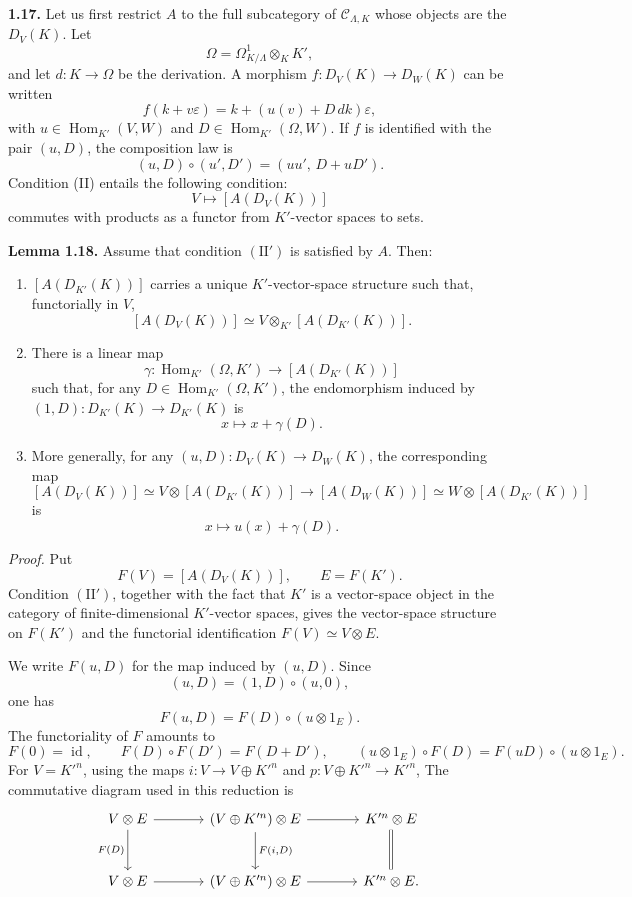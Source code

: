 \documentclass[11pt]{article}
\providecommand{\Hom}{\operatorname{Hom}}
\begin{document}
\textbf{1.17.} Let us first restrict \(A\) to the full subcategory of
\(\mathcal C_{\Lambda,K}\) whose objects are the \(D_V(K)\). Let
\[
 \Omega=\Omega^1_{K/\Lambda}\otimes_K K',
\]
and let \(d:K\to \Omega\) be the derivation. A morphism
\(f:D_V(K)\to D_W(K)\) can be written
\[
 f(k+v\varepsilon)=k+(u(v)+D\,dk)\varepsilon,
\]
with \(u\in\Hom_{K'}(V,W)\) and \(D\in\Hom_{K'}(\Omega,W)\). If \(f\) is identified
with the pair \((u,D)\), the composition law is
\[
 (u,D)\circ(u',D')=(uu',\,D+uD').
\]
Condition (II) entails the following condition:
\[
\tag{II'}
 V\longmapsto [A(D_V(K))]
\]
commutes with products as a functor from \(K'\)-vector spaces to sets.

\textbf{Lemma 1.18.} Assume that condition \((\mathrm{II}')\) is satisfied by \(A\). Then:

\begin{enumerate}[label=(\arabic*)]
\item \([A(D_{K'}(K))]\) carries a unique \(K'\)-vector-space structure such that, functorially in
\(V\),
\[
 [A(D_V(K))]\simeq V\otimes_{K'}[A(D_{K'}(K))].
\]
\item There is a linear map
\[
 \gamma:\Hom_{K'}(\Omega,K')\longrightarrow [A(D_{K'}(K))]
\]
such that, for any \(D\in\Hom_{K'}(\Omega,K')\), the endomorphism induced by
\((1,D):D_{K'}(K)\to D_{K'}(K)\) is
\[
 x\longmapsto x+\gamma(D).
\]
\item More generally, for any \((u,D):D_V(K)\to D_W(K)\), the corresponding map
\[
 [A(D_V(K))]\simeq V\otimes[A(D_{K'}(K))]
 \longrightarrow
 [A(D_W(K))]\simeq W\otimes[A(D_{K'}(K))]
\]
is
\[
 x\longmapsto u(x)+\gamma(D).
\]
\end{enumerate}

\emph{Proof.} Put
\[
 F(V)=[A(D_V(K))],\qquad E=F(K').
\]
Condition \((\mathrm{II}')\), together with the fact that \(K'\) is a vector-space
object in the category of finite-dimensional \(K'\)-vector spaces, gives the vector-space
structure on \(F(K')\) and the functorial identification \(F(V)\simeq V\otimes E\).

We write \(F(u,D)\) for the map induced by \((u,D)\). Since
\[
 (u,D)=(1,D)\circ(u,0),
\]
one has
\[
 F(u,D)=F(D)\circ(u\otimes 1_E).
\]
The functoriality of \(F\) amounts to
\[
 F(0)=\operatorname{id},\qquad
 F(D)\circ F(D')=F(D+D'),\qquad
 (u\otimes 1_E)\circ F(D)=F(uD)\circ(u\otimes 1_E).
\]
For \(V=K'^n\), using the maps \(i:V\to V\oplus K'^n\) and
\(p:V\oplus K'^n\to K'^n\), 
The commutative diagram used in this reduction is
\[
\begin{tikzcd}[column sep=large,row sep=large]
V\otimes E \arrow[r] \arrow[d,"F(D)"'] &
(V\oplus K'^n)\otimes E \arrow[r] \arrow[d,"{F(i,D)}"] &
K'^n\otimes E \arrow[d,equal]\\
V\otimes E \arrow[r] &
(V\oplus K'^n)\otimes E \arrow[r] &
K'^n\otimes E .
\end{tikzcd}
\]
\end{document}
